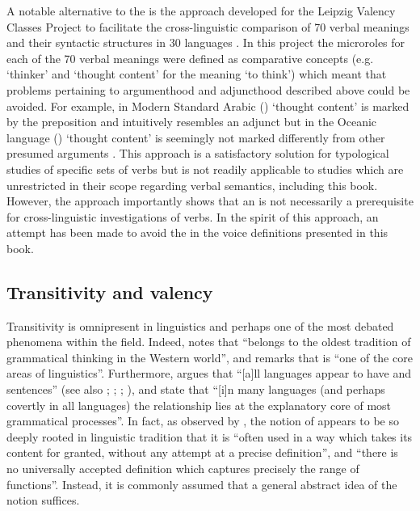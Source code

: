 A notable alternative to the  is the  approach developed for the Leipzig Valency Classes Project to facilitate the cross-linguistic comparison of 70 verbal meanings and their syntactic structures in 30 languages \citep{hartmann:al:2013, malchukov:comrie:2015a, malchukov:comrie:2015b}. In this project the microroles for each of the 70 verbal meanings were defined as comparative concepts (e.g. ‘thinker’ and ‘thought content’ for the meaning ‘to think’) which meant that problems pertaining to argumenthood and adjuncthood described above could be avoided. For example, in Modern Standard Arabic () ‘thought content’ is marked by the preposition  and intuitively resembles an adjunct \citep{kasz:2013} but in the Oceanic language  () ‘thought content’ is seemingly not marked differently from other presumed arguments \citep{moyse-faurie:2013}. This approach is a satisfactory solution for typological studies of specific sets of verbs but is not readily applicable to studies which are unrestricted in their scope regarding verbal semantics, including this book. However, the  approach importantly shows that an  is not necessarily a prerequisite for cross-linguistic investigations of verbs. In the spirit of this approach, an attempt has been made to avoid the  in the voice definitions presented in this book.

\subsection{Transitivity and valency} \label{transitivity-valency}
Transitivity is omnipresent in linguistics and perhaps one of the most debated phenomena within the field. Indeed, \citet[142]{lazard:2002} notes that  “belongs to the oldest tradition of grammatical thinking in the Western world”, and \citet[346]{kittila:2010} remarks that  is “one of the core areas of linguistics”. Furthermore, \citet[128]{dixon:1972} argues that “[a]ll languages appear to have  and  sentences” (see also \citealt[102]{dixon:1979}; \citeyear[6]{dixon:1994}; \citeyear[30]{dixon:2000}; \citealt[2]{dixon:aikhenvald:2000}), and \citet[1]{hopper:thompson:1982} state that “[i]n many languages (and perhaps covertly in all languages) the  relationship lies at the explanatory core of most grammatical processes”. In fact, as observed by \citet[2]{nass:2007}, the notion of  appears to be so deeply rooted in linguistic tradition that it is “often used in a way which takes its content for granted, without any attempt at a precise definition”, and “there is no universally accepted definition which captures precisely the range of functions”. Instead, it is commonly assumed that a general abstract idea of the notion suffices.

